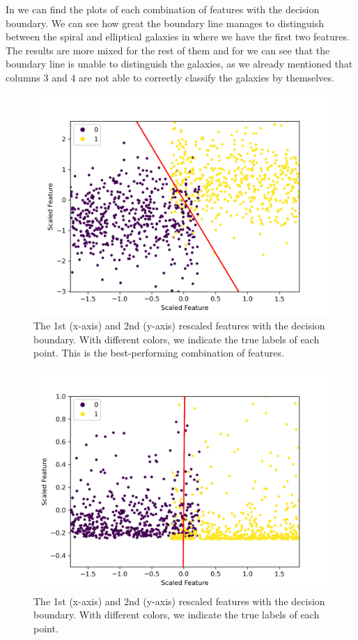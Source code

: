 \documentclass[a4paper,10pt]{article}
\begin{document}
In  we can find the plots of each combination of features with the decision boundary. We can see how great the boundary line manages to distinguish between the spiral and elliptical galaxies in  where we have the first two features. The results are more mixed for the rest of them and for  we can see that the boundary line is unable to distinguish the galaxies, as we already mentioned that columns 3 and 4 are not able to correctly classify the galaxies by themselves. 

\begin{figure}[H]
  \centering
  \includegraphics[width=.8\linewidth]{./plots/boundary_1-2.png}
  \caption{The 1st (x-axis) and 2nd (y-axis) rescaled features with the decision boundary. With different colors, we indicate the true labels of each point. This is the best-performing combination of features.}
  \label{fig:boun_1_2}
\end{figure}

\begin{figure}[H]
  \centering
  \includegraphics[width=.8\linewidth]{./plots/boundary_1-3.png}
  \caption{The 1st (x-axis) and 2nd (y-axis) rescaled features with the decision boundary. With different colors, we indicate the true labels of each point.}
  \label{fig:boun_1_3}
\end{figure}
\end{document}
